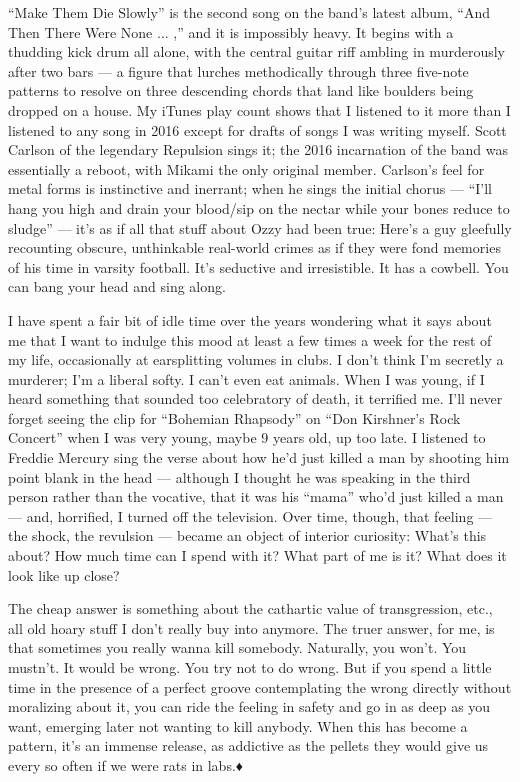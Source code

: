 ``Make Them Die Slowly'' is the second song on the band's latest album,
``And Then There Were None ... ,'' and it is impossibly heavy. It begins
with a thudding kick drum all alone, with the central guitar riff
ambling in murderously after two bars --- a figure that lurches
methodically through three five-note patterns to resolve on three
descending chords that land like boulders being dropped on a house. My
iTunes play count shows that I listened to it more than I listened to
any song in 2016 except for drafts of songs I was writing myself. Scott
Carlson of the legendary Repulsion sings it; the 2016 incarnation of the
band was essentially a reboot, with Mikami the only original member.
Carlson's feel for metal forms is instinctive and inerrant; when he
sings the initial chorus --- ``I'll hang you high and drain your
blood/sip on the nectar while your bones reduce to sludge'' --- it's as
if all that stuff about Ozzy had been true: Here's a guy gleefully
recounting obscure, unthinkable real-world crimes as if they were fond
memories of his time in varsity football. It's seductive and
irresistible. It has a cowbell. You can bang your head and sing along.

I have spent a fair bit of idle time over the years wondering what it
says about me that I want to indulge this mood at least a few times a
week for the rest of my life, occasionally at earsplitting volumes in
clubs. I don't think I'm secretly a murderer; I'm a liberal softy. I
can't even eat animals. When I was young, if I heard something that
sounded too celebratory of death, it terrified me. I'll never forget
seeing the clip for ``Bohemian Rhapsody'' on ``Don Kirshner's Rock
Concert'' when I was very young, maybe 9 years old, up too late. I
listened to Freddie Mercury sing the verse about how he'd just killed a
man by shooting him point blank in the head --- although I thought he
was speaking in the third person rather than the vocative, that it was
his ``mama'' who'd just killed a man --- and, horrified, I turned off
the television. Over time, though, that feeling --- the shock, the
revulsion --- became an object of interior curiosity: What's this about?
How much time can I spend with it? What part of me is it? What does it
look like up close?

The cheap answer is something about the cathartic value of
transgression, etc., all old hoary stuff I don't really buy into
anymore. The truer answer, for me, is that sometimes you really wanna
kill somebody. Naturally, you won't. You mustn't. It would be wrong. You
try not to do wrong. But if you spend a little time in the presence of a
perfect groove contemplating the wrong directly without moralizing about
it, you can ride the feeling in safety and go in as deep as you want,
emerging later not wanting to kill anybody. When this has become a
pattern, it's an immense release, as addictive as the pellets they would
give us every so often if we were rats in labs.♦

